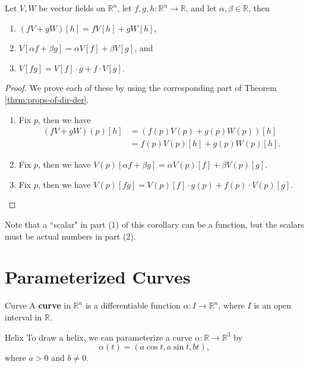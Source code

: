 \documentclass[10pt]{report}
\begin{document}
\begin{cor}
	Let $V,W$ be vector fields on $\mathbb{R}^n$, let $f,g,h:\mathbb{R}^n \to \mathbb{R}$, and let $\alpha,\beta \in \mathbb{R}$, then
	\begin{enumerate}
		\item $(fV+gW)[h] = fV[h] + gW[h]$,
		\item $V[\alpha f+\beta g] = \alpha V[f] + \beta V[g]$, and
		\item $V[fg] = V[f] \cdot g + f \cdot V[g]$.
	\end{enumerate}
\end{cor}
\begin{proof}
	We prove each of these by using the corresponding part of Theorem \ref{thrm:props-of-dir-der}.

	\begin{enumerate}
		\item Fix $p$, then we have
			\begin{align*}
				(fV+gW)(p)[h] &= (f(p)V(p)+g(p)W(p))[h] \\ &= f(p)V(p)[h]+g(p)W(p)[h].
			\end{align*}

		\item Fix $p$, then we have $V(p)[\alpha f + \beta g] = \alpha V(p) [f] + \beta V(p) [g].$

		\item Fix $p$, then we have $V(p)[fg] = V(p)[f] \cdot g(p) + f(p) \cdot V(p)[g].$
	\end{enumerate}
\end{proof}

Note that a ``scalar" in part (1) of this corollary can be a function, but the scalars must be actual numbers in part (2).


\section{Parameterized Curves}

\begin{defn}{Curve}{}
A \textbf{curve} in $\mathbb{R}^n$ is a differentiable function $\alpha:I\to \mathbb{R}^n$, where $I$ is an open interval in $\mathbb{R}$.
\end{defn}

\begin{ex}{Helix}{}
	To draw a helix, we can parameterize a curve $\alpha:\mathbb{R}\to \mathbb{R}^3$ by 
	\[
		\alpha(t)=(a \cos t, a \sin t, bt),
	\] where $a>0$ and $b\neq 0$.
\end{ex}
\end{document}
